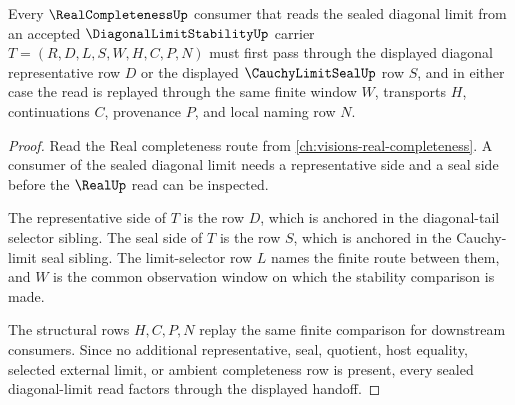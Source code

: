 \begin{theorem}
\label{thm:diagonal-limit-stability-real-completeness-handoff}
Every $\RealCompletenessUp$ consumer that reads the sealed diagonal limit from an accepted $\DiagonalLimitStabilityUp$ carrier $T=(R,D,L,S,W,H,C,P,N)$ must first pass through the displayed diagonal representative row $D$ or the displayed $\CauchyLimitSealUp$ row $S$, and in either case the read is replayed through the same finite window $W$, transports $H$, continuations $C$, provenance $P$, and local naming row $N$.
\end{theorem}
\begin{proof}
Read the Real completeness route from \autoref{ch:visions-real-completeness}. A consumer of the sealed diagonal limit needs a representative side and a seal side before the $\RealUp$ read can be inspected.

The representative side of $T$ is the row $D$, which is anchored in the diagonal-tail selector sibling. The seal side of $T$ is the row $S$, which is anchored in the Cauchy-limit seal sibling. The limit-selector row $L$ names the finite route between them, and $W$ is the common observation window on which the stability comparison is made.

The structural rows $H,C,P,N$ replay the same finite comparison for downstream consumers. Since no additional representative, seal, quotient, host equality, selected external limit, or ambient completeness row is present, every sealed diagonal-limit read factors through the displayed handoff.
\end{proof}

